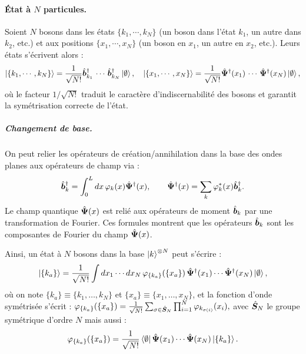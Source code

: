 \paragraph{État à $N$ particules.} Soient $N$ bosons dans les états $\{ k_1 , \cdots , k_N \}$ (un boson dans l’état $k_1$, un autre dans $k_2$, etc.) et aux positions $\{ x_1 , \cdots , x_N \}$ (un boson en $x_1$, un autre en $x_2$, etc.). Leurs états s’écrivent alors :
\begin{eqnarray}
	\ket{ \{ k_1 , \cdots , k_N \}} = \frac{1}{\sqrt{N!}} \hat{\bm{b}}_{k_1}^\dag\, \cdots \, \hat{\bm{b}}_{k_N}^\dag \ket{\emptyset}, \quad \ket{\{x_1 , \cdots , x_N\}} = \frac{1}{\sqrt{N!}} \hat{\bm{\Psi}}^\dag(x_1)\, \cdots \, \hat{\bm{\Psi}}^\dag(x_N) \ket{\emptyset}	, \label{eq.chap.1.ket.N}
\end{eqnarray}
où le facteur \( 1/\sqrt{N!} \) traduit le caractère d’indiscernabilité des bosons et garantit la symétrisation correcte de l’état.

\begin{mdframed}[
	linewidth=0.5pt, 
	backgroundcolor=gray!5, 
	roundcorner=50pt,	
	innerleftmargin=5pt,
    innerrightmargin=5pt,
    innertopmargin=-10pt,
    innerbottommargin=2pt,
    leftmargin=2pt,
    rightmargin=2pt
	]
\subparagraph{Changement de base.}
On peut relier les opérateurs de création/annihilation dans la base des ondes planes aux opérateurs de champ via :
\begin{eqnarray}\label{chap.1:eq.rapel.etat.second.1}
	\hat{\bm{b}}_k^\dagger = \int_0^L dx \, \varphi_k(x) \hat{\bm{\Psi}}^\dagger(x), \qquad 
	\hat{\bm{\Psi}}^\dagger(x) = \sum_k \varphi_k^\ast(x)\hat{\bm{b}}_k^\dagger.\label{eq.chap.1.TF.1}
\end{eqnarray}
Le champ quantique $\hat{\bm{\Psi}}(x)$ est relié aux opérateurs de moment $\hat{\bm{b}}_k$ par une transformation de Fourier. Ces formules montrent que les opérateurs $\hat{\bm{b}}_{k}$ sont les composantes de Fourier du champ $\hat{\bm{\Psi}}(x)$.
\end{mdframed}
Ainsi, un état à \(N\) bosons dans la base \( \ket{k}^{\otimes N} \) peut s’écrire :
\begin{eqnarray}
	\ket{\{k_a\}} = \frac{1}{\sqrt{N!}} \int dx_1 \cdots dx_N \, \varphi_{\{k_a\}} ( \{x_a\} ) \, \hat{\bm{\Psi}}^\dag(x_1) \cdots \hat{\bm{\Psi}}^\dag(x_N) \ket{\emptyset},
\end{eqnarray}
où on note \( \{k_a\} \equiv \{k_1, \dots, k_N\} \) et \( \{x_a\} \equiv \{x_1, \dots, x_N\} \), et la fonction d’onde symétrisée s’écrit :
\(
	\varphi_{\{k_a\}} ( \{x_a\} ) = \frac{1}{\sqrt{N!}} \sum_{\sigma \in \hat{\bm{S}}_N } \prod_{i=1}^N \varphi_{k_{\sigma(i)}}(x_i),
\) 
avec $\hat{\bm{S}}_N $  le groupe symétrique d'ordre $N$ mais aussi :
\begin{eqnarray}\label{chap.1:eq.rapel.fonction.propre.N}
	\varphi_{\{k_a\}} (\{x_a\}) = \frac{1}{\sqrt{N!}} \bra{\emptyset} \hat{\bm{\Psi}}(x_1) \cdots \hat{\bm{\Psi}}(x_N) \ket{\{k_a\}}.
\end{eqnarray}



